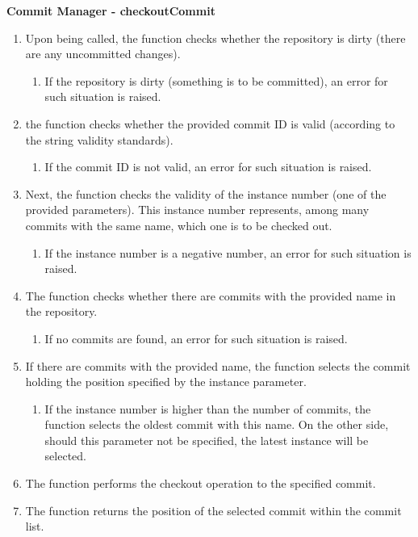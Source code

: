 \textbf{Commit Manager - checkoutCommit}
\begin{enumerate}
    \item Upon being called, the function checks whether the repository is dirty (there are any uncommitted changes).
    \begin{enumerate}
        \item If the repository is dirty (something is to be committed), an error for such situation is raised.
    \end{enumerate}

    \item the function checks whether the provided commit ID is valid (according to the string validity standards).
    \begin{enumerate}
        \item If the commit ID is not valid, an error for such situation is raised.
    \end{enumerate}

    \item Next, the function checks the validity of the instance number (one of the provided parameters). This instance number represents, among many commits with the same name, which one is to be checked out.
    \begin{enumerate}
        \item If the instance number is a negative number, an error for such situation is raised.
    \end{enumerate}

    \item The function checks whether there are commits with the provided name in the repository.
    \begin{enumerate}
        \item If no commits are found, an error for such situation is raised.
    \end{enumerate}

    \item If there are commits with the provided name, the function selects the commit holding the position specified by the instance parameter.
    \begin{enumerate}
        \item If the instance number is higher than the number of commits, the function selects the oldest commit with this name. On the other side, should this parameter not be specified, the latest instance will be selected.
    \end{enumerate}

    \item The function performs the checkout operation to the specified commit.

    \item The function returns the position of the selected commit within the commit list.
\end{enumerate}

